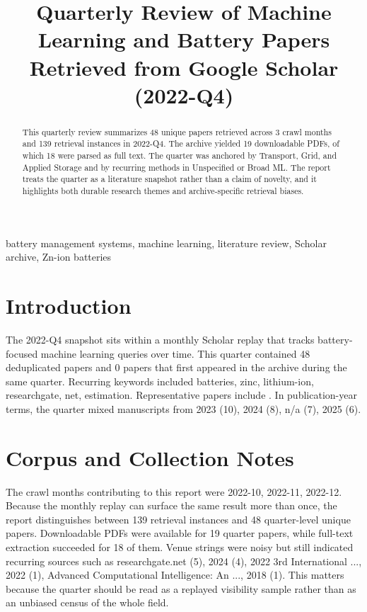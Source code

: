 \documentclass[conference]{IEEEtran}
\begin{document}
\title{ Quarterly Review of Machine Learning and Battery Papers Retrieved from Google Scholar (2022-Q4) }

\author{
}

\maketitle

\begin{abstract}
This quarterly review summarizes 48 unique papers retrieved across 3 crawl months and 139 retrieval instances in 2022-Q4. The archive yielded 19 downloadable PDFs, of which 18 were parsed as full text. The quarter was anchored by Transport, Grid, and Applied Storage and by recurring methods in Unspecified or Broad ML. The report treats the quarter as a literature snapshot rather than a claim of novelty, and it highlights both durable research themes and archive-specific retrieval biases.
\end{abstract}

\begin{IEEEkeywords}
battery management systems, machine learning, literature review, Scholar archive, Zn-ion batteries
\end{IEEEkeywords}

\section{Introduction}
The 2022-Q4 snapshot sits within a monthly Scholar replay that tracks battery-focused machine learning queries over time. This quarter contained 48 deduplicated papers and 0 papers that first appeared in the archive during the same quarter. Recurring keywords included batteries, zinc, lithium-ion, researchgate, net, estimation. Representative papers include \cite{machinelearningdriven2025,socestimationof2023,recentadvancesin2025,aphysicsinspired2023}. In publication-year terms, the quarter mixed manuscripts from 2023 (10), 2024 (8), n/a (7), 2025 (6).

\section{Corpus and Collection Notes}
The crawl months contributing to this report were 2022-10, 2022-11, 2022-12. Because the monthly replay can surface the same result more than once, the report distinguishes between 139 retrieval instances and 48 quarter-level unique papers. Downloadable PDFs were available for 19 quarter papers, while full-text extraction succeeded for 18 of them. Venue strings were noisy but still indicated recurring sources such as researchgate.net (5), 2024 (4), 2022 3rd International ..., 2022 (1), Advanced Computational Intelligence: An ..., 2018 (1). This matters because the quarter should be read as a replayed visibility sample rather than as an unbiased census of the whole field.
\end{document}
